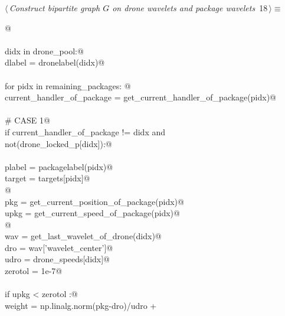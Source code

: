 \documentclass[10pt, english, oneside]{report}
\begin{document}
\begin{flushleft} \small
\begin{minipage}{\linewidth}\label{scrap16}\raggedright\small
{} $\langle\,${\itshape Construct bipartite graph $G$ on drone wavelets and package wavelets}\nobreak\ {\footnotesize {18}}$\,\rangle\equiv$
\vspace{-1ex}
\begin{list}{}{} \item
\mbox{}\verb@  @\\
\mbox{}\verb@@\\
\mbox{}\verb@for didx in drone_pool:@\\
\mbox{}\verb@    dlabel = dronelabel(didx)@\\
\mbox{}\verb@@\\
\mbox{}\verb@    for pidx in remaining_packages: @\\
\mbox{}\verb@        current_handler_of_package = get_current_handler_of_package(pidx)@\\
\mbox{}\verb@@\\
\mbox{}\verb@        # CASE 1@\\
\mbox{}\verb@        if current_handler_of_package != didx and \@\\
\mbox{}\verb@           not(drone_locked_p[didx]):@\\
\mbox{}\verb@@\\
\mbox{}\verb@                plabel = packagelabel(pidx)@\\
\mbox{}\verb@                target = targets[pidx]@\\
\mbox{}\verb@ @\\
\mbox{}\verb@                pkg  = get_current_position_of_package(pidx)@\\
\mbox{}\verb@                upkg = get_current_speed_of_package(pidx)@\\
\mbox{}\verb@    @\\
\mbox{}\verb@                wav  = get_last_wavelet_of_drone(didx)@\\
\mbox{}\verb@                dro  = wav['wavelet_center']@\\
\mbox{}\verb@                udro = drone_speeds[didx]@\\
\mbox{}\verb@                zerotol = 1e-7@\\
\mbox{}\verb@@\\
\mbox{}\verb@                if upkg < zerotol :@\\
\mbox{}\verb@                      weight = np.linalg.norm(pkg-dro)/udro +\@\\

\end{list}
\end{minipage}
\end{flushleft}
\end{document}
